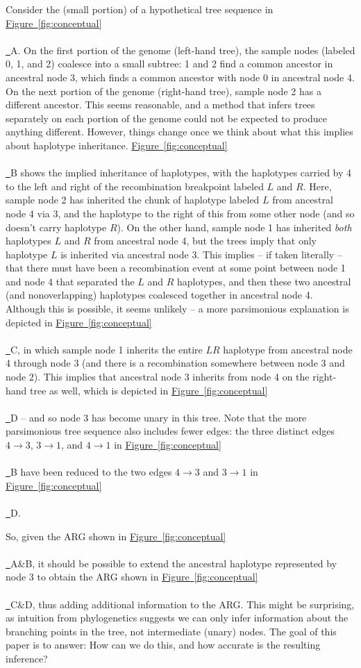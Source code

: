 \documentclass[10pt,twoside,lineno]{gsajnl}
\newcommand*{\figref}[2][]{%
	\hyperref[{#2}]{%
		Figure~\ref*{#2}%
		\ifx\\#1\\%
		\else
		\,#1%
		\fi
	}%
}
\begin{document}

Consider the (small portion) of a hypothetical tree sequence in \figref{fig:conceptual}A.
On the first portion of the genome (left-hand tree), the sample nodes (labeled 0, 1, and 2)
coalesce into a small subtree: 1 and 2 find a common ancestor in ancestral node 3,
which finds a common ancestor with node 0 in ancestral node 4.
On the next portion of the genome (right-hand tree), sample node 2 has a different ancestor.
This seems reasonable, and a method that infers trees separately on each portion of the genome
could not be expected to produce anything different.
However, things change once we think about what this implies about haplotype inheritance.
\figref{fig:conceptual}B shows the implied inheritance of haplotypes,
with the haplotypes carried by 4 to the left and right of the recombination breakpoint labeled $L$ and $R$.
Here, sample node 2 has inherited the chunk of haplotype labeled $L$ from ancestral node 4 via 3,
and the haplotype to the right of this from some other node (and so doesn't carry haplotype $R$).
On the other hand, sample node 1 has inherited \emph{both} haplotypes $L$ and $R$
from ancestral node 4, but the trees imply that only haplotype $L$ is inherited via ancestral node 3.
This implies -- if taken literally -- that there must have been a recombination event
at some point between node 1 and node 4 that separated the $L$ and $R$ haplotypes,
and then these two ancestral (and nonoverlapping) haplotypes coalesced together in ancestral node 4.
Although this is possible, it seems unlikely --
a more parsimonious explanation is depicted in \figref{fig:conceptual}C,
in which sample node 1 inherits the entire $LR$ haplotype from ancestral node 4 through node 3
(and there is a recombination somewhere between node 3 and node 2).
This implies that ancestral node 3 inherits from node 4 on the right-hand tree as well,
which is depicted in \figref{fig:conceptual}D --
and so node 3 has become unary in this tree.
Note that the more parsimonious tree sequence also includes fewer edges:
the three distinct edges $4 \to 3$, $3 \to 1$, and $4 \to 1$ in \figref{fig:conceptual}B
have been reduced to the two edges
$4 \to 3$ and $3 \to 1$ in \figref{fig:conceptual}D.

So, given the ARG shown in \figref{fig:conceptual}A\&B,
it should be possible to extend the ancestral haplotype represented by node 3
to obtain the ARG shown in \figref{fig:conceptual}C\&D,
thus adding additional information to the ARG.
This might be surprising,
as intuition from phylogenetics suggests we can only infer
information about the branching points in the tree, not intermediate (unary) nodes.
The goal of this paper is to answer:
How can we do this, and how accurate is the resulting inference?
\end{document}
